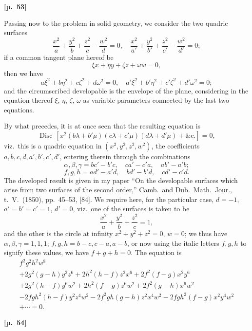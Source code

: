 \documentclass[11pt,a4paper]{book}
\providecommand{\Disc}{\mathop{\mathrm{Disc}}\nolimits}
\begin{document}
\vspace{0.5em}
\noindent\textbf{[p.\ 53]}

Passing now to the problem in solid geometry, we consider the two quadric surfaces
$$
\frac{x^2}{a} + \frac{y^2}{b} + \frac{z^2}{c} - \frac{w^2}{d} = 0, \quad \frac{x^2}{a'} + \frac{y^2}{b'} + \frac{z^2}{c'} - \frac{w^2}{d'} = 0;
$$
if a common tangent plane hereof be
$$
\xi x + \eta y + \zeta z + \omega w = 0,
$$
then we have
$$
a\xi^2 + b\eta^2 + c\zeta^2 + d\omega^2 = 0, \quad a'\xi^2 + b'\eta^2 + c'\zeta^2 + d'\omega^2 = 0;
$$
and the circumscribed developable is the envelope of the plane, considering in the equation thereof $\xi$, $\eta$, $\zeta$, $\omega$ as variable parameters connected by the last two equations.

By what precedes, it is at once seen that the resulting equation is
$$
\Disc\, [x^2(b\lambda + b'\mu)(c\lambda + c'\mu)(d\lambda + d'\mu) + \text{\&c.}] = 0,
$$
viz.\ this is a quadric equation in $(x^2, y^2, z^2, w^2)$, the coefficients $a, b, c, d, a', b', c', d'$, entering therein through the combinations
$$
\alpha, \beta, \gamma = bc' - b'c, \quad ca' - c'a, \quad ab' - a'b;
$$
$$
f, g, h = ad' - a'd, \quad bd' - b'd, \quad cd' - c'd.
$$
The developed result is given in my paper ``On the developable surfaces which arise from two surfaces of the second order,'' Camb.\ and Dub.\ Math.\ Jour., t.\ V.\ (1850), pp.\ 45--53, [84]. We require here, for the particular case, $d = -1$, $a' = b' = c' = 1$, $d' = 0$, viz.\ one of the surfaces is taken to be
$$
\frac{x^2}{a} + \frac{y^2}{b} + \frac{z^2}{c} = 1,
$$
and the other is the circle at infinity $x^2 + y^2 + z^2 = 0$, $w = 0$; we thus have $\alpha, \beta, \gamma = 1, 1, 1$; $f, g, h = b - c, c - a, a - b$, or now using the italic letters $f, g, h$ to signify these values, we have $f + g + h = 0$. The equation is
\begin{multline*}
f^2 g^2 h^2 w^8 \\
+ 2g^2(g - h)y^2 z^6 + 2h^2(h - f)z^2 x^6 + 2f^2(f - g)x^2 y^6 \\
+ 2g^2(h - f)y^6 w^2 + 2h^2(f - g)z^6 w^2 + 2f^2(g - h)x^6 w^2 \\
- 2fgh^2(h - f)y^2 z^4 w^2 - 2f^2 g h(g - h)z^2 x^4 w^2 - 2fgh^2(f - g)x^2 y^4 w^2 \\
+ \cdots = 0.
\end{multline*}

\vspace{0.5em}
\noindent\textbf{[p.\ 54]}
\end{document}

